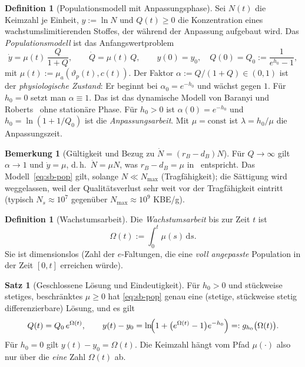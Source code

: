 \documentclass[a4paper, 12pt, twoside, openright]{report}
\theoremstyle{definition}
\newtheorem{definition}[theorem]{Definition}
\theoremstyle{definition}
\newtheorem{satz}{Satz}[chapter]
\newtheorem{bemerkung}{Bemerkung}[chapter]
\begin{document}
\begin{definition}[Populationsmodell mit Anpassungsphase]\label{def:sb-pop}
Sei $N(t)$ die Keimzahl je Einheit, $y:=\ln N$ und $Q(t)\ge0$ die Konzentration eines
wachstumslimitierenden Stoffes, der während der Anpassung aufgebaut wird. Das
\emph{Populationsmodell} ist das Anfangswertproblem
\begin{equation}
  \dot y=\mu(t)\,\frac{Q}{1+Q},\qquad \dot Q=\mu(t)\,Q,\qquad
  y(0)=y_0,\quad Q(0)=Q_0:=\frac{1}{e^{h_0}-1},
  \label{eq:sb-pop}
\end{equation}
mit $\mu(t):=\mu_a(\vartheta_p(t),c(t))$. Der Faktor $\alpha:=Q/(1+Q)\in(0,1)$ ist der
\emph{physiologische Zustand}: Er beginnt bei $\alpha_0=e^{-h_0}$ und wächst gegen $1$.
Für $h_0=0$ setzt man $\alpha\equiv1$. Das ist das dynamische Modell von Baranyi und
Roberts~\cite{baranyi1994} ohne stationäre Phase. Für $h_0>0$ ist $\alpha(0)=e^{-h_0}$ und
$h_0=\ln(1+1/Q_0)$ ist die \emph{Anpassungsarbeit}. Mit $\mu=\mathrm{const}$ ist
$\lambda=h_0/\mu$ die Anpassungszeit.
\end{definition}

\begin{bemerkung}[Gültigkeit und Bezug zu $\dot N=(r_B-d_B)N$]
Für $Q\to\infty$ gilt $\alpha\to1$ und $\dot y=\mu$, d.\,h.\ $\dot N=\mu N$, was
$r_B-d_B=\mu$ in~\cite{epp_bgies} entspricht. Das Modell~\eqref{eq:sb-pop} gilt, solange
$N\ll N_{\max}$ (Tragfähigkeit); die Sättigung wird weggelassen, weil der Qualitätsverlust
sehr weit vor der Tragfähigkeit eintritt (typisch $N_s\approx10^7$ gegenüber
$N_{\max}\approx10^9$ KBE/g).
\end{bemerkung}

\begin{definition}[Wachstumsarbeit]\label{def:sb-omega}
Die \emph{Wachstumsarbeit} bis zur Zeit $t$ ist
\begin{equation}
  \Omega(t):=\int_0^t\mu(s)\,\mathrm ds .
  \label{eq:sb-Omega}
\end{equation}
Sie ist dimensionslos (Zahl der $e$-Faltungen, die eine \emph{voll angepasste} Population
in der Zeit $[0,t]$ erreichen würde).
\end{definition}

\begin{satz}[Geschlossene Lösung und Eindeutigkeit]\label{satz:sb-loesung}
Für $h_0>0$ und stückweise stetiges, beschränktes $\mu\ge0$ hat \eqref{eq:sb-pop} genau eine
(stetige, stückweise stetig differenzierbare) Lösung, und es gilt
\begin{equation}
  Q(t)=Q_0\,e^{\Omega(t)},\qquad
  y(t)-y_0=\ln\!\Bigl(1+\bigl(e^{\Omega(t)}-1\bigr)e^{-h_0}\Bigr)=:g_{h_0}\bigl(\Omega(t)\bigr).
  \label{eq:sb-lsg}
\end{equation}
Für $h_0=0$ gilt $y(t)-y_0=\Omega(t)$. Die Keimzahl hängt vom Pfad $\mu(\cdot)$ also nur
über die \emph{eine} Zahl $\Omega(t)$ ab.
\end{satz}
\end{document}
